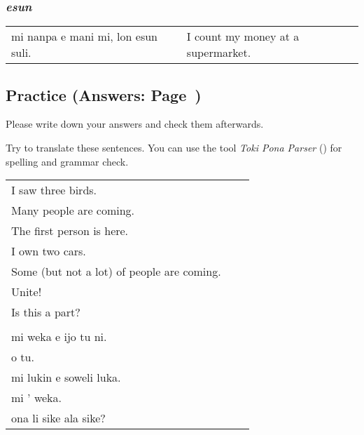 %
%
\subsubsection*{\textit{esun}}
%

\begin{supertabular}{p{5,5cm}|ll}
mi nanpa e mani mi, lon esun suli. && I count my money at a supermarket. \\
\end{supertabular}

%
%
%
\newpage
%
\subsection*{Practice (Answers: Page~\pageref{'numbers'})}
%
Please write down your answers and check them afterwards. 

Try to translate these sentences. 
You can use the tool \textit{Toki Pona Parser} (\cite{www:rowa:02}) for spelling and grammar check. 

\begin{supertabular}{p{5,5cm}|ll}
I saw three birds.  &&   \\ %
Many people are coming. &&  \\   %
The first person is here. && \\   %
I own two cars.  &&  \\ %
Some (but not a lot) of people are coming. && \\  %
Unite!  &&   \\ %
Is this a part? &&  \\ %
 && \\ %
mi weka e ijo tu ni. &&   \\ %
o tu.  &&  \\ %
mi lukin e soweli luka. && \\   %
mi ' weka.  &&  \\ %
ona li sike ala sike? && \\ %
\end{supertabular}
